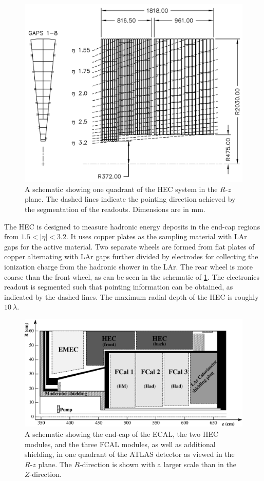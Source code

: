 \begin{figure}[ht] 
\centering
\includegraphics[width=.7\textwidth]{figures/atlas/hec.pdf}
\caption{ A schematic showing one quadrant of the 
HEC system in the $R$-$z$ plane. The dashed lines indicate
the pointing direction achieved by the segmentation of the 
readouts.  Dimensions are in mm.  }
\label{fig:atlas_hec}
\end{figure}


The HEC is designed to measure hadronic energy deposits in the 
end-cap regions from $1.5 < |\eta|< 3.2$. It uses 
copper plates as the sampling material with LAr gaps
for the active material. Two separate wheels are formed from
flat plates of copper alternating with LAr gaps further divided by electrodes for
collecting the ionization charge from the hadronic shower in the LAr.
The rear wheel is more coarse than the front wheel,
as can be seen in the schematic of \fig\ref{fig:atlas_hec}.
The electronics readout is segmented such that pointing information
can be obtained, as indicated by the dashed lines.
The maximum radial depth of the HEC is roughly $10~\lambda$.



\begin{figure}[ht] 
\centering
\includegraphics[width=.7\textwidth]{figures/atlas/fcal.eps}
\caption{ A schematic showing the end-cap of the ECAL,
the two HEC modules, and the three FCAL modules, as well
as additional shielding, in one
quadrant of the ATLAS detector as viewed 
in the $R$-$z$ plane.
The $R$-direction is shown with a larger scale than in the $Z$-direction.
}
\label{fig:atlas_fcal}
\end{figure}


